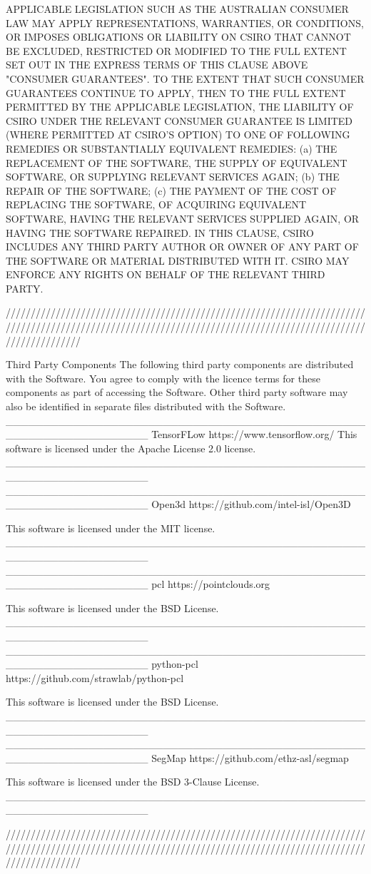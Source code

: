 APPLICABLE LEGISLATION SUCH AS THE AUSTRALIAN CONSUMER LAW MAY APPLY REPRESENTATIONS, WARRANTIES, OR CONDITIONS, OR IMPOSES OBLIGATIONS OR LIABILITY ON CSIRO THAT CANNOT BE EXCLUDED, RESTRICTED OR MODIFIED TO THE FULL EXTENT SET OUT IN THE EXPRESS TERMS OF THIS CLAUSE ABOVE "CONSUMER GUARANTEES".  TO THE EXTENT THAT SUCH CONSUMER GUARANTEES CONTINUE TO APPLY, THEN TO THE FULL EXTENT PERMITTED BY THE APPLICABLE LEGISLATION, THE LIABILITY OF CSIRO UNDER THE RELEVANT CONSUMER GUARANTEE IS LIMITED (WHERE PERMITTED AT CSIRO’S OPTION) TO ONE OF FOLLOWING REMEDIES OR SUBSTANTIALLY EQUIVALENT REMEDIES:
(a)               THE REPLACEMENT OF THE SOFTWARE, THE SUPPLY OF EQUIVALENT SOFTWARE, OR SUPPLYING RELEVANT SERVICES AGAIN;
(b)               THE REPAIR OF THE SOFTWARE;
(c)               THE PAYMENT OF THE COST OF REPLACING THE SOFTWARE, OF ACQUIRING EQUIVALENT SOFTWARE, HAVING THE RELEVANT SERVICES SUPPLIED AGAIN, OR HAVING THE SOFTWARE REPAIRED.
IN THIS CLAUSE, CSIRO INCLUDES ANY THIRD PARTY AUTHOR OR OWNER OF ANY PART OF THE SOFTWARE OR MATERIAL DISTRIBUTED WITH IT.  CSIRO MAY ENFORCE ANY RIGHTS ON BEHALF OF THE RELEVANT THIRD PARTY.

///////////////////////////////////////////////////////////////////////////////////////////////////////////////////////////////////////////////////////////////

Third Party Components
The following third party components are distributed with the Software.  You agree to comply with the licence terms for these components as part of accessing the Software.  Other third party software may also be identified in separate files distributed with the Software.
___________________________________________________________________
TensorFLow  https://www.tensorflow.org/
This software is licensed under the Apache License 2.0 license.
___________________________________________________________________
___________________________________________________________________
Open3d https://github.com/intel-isl/Open3D

This software is licensed under the MIT license.
___________________________________________________________________
___________________________________________________________________
pcl https://pointclouds.org

This software is licensed under the BSD License.
___________________________________________________________________
___________________________________________________________________
python-pcl https://github.com/strawlab/python-pcl

This software is licensed under the BSD License.
___________________________________________________________________
___________________________________________________________________
SegMap https://github.com/ethz-asl/segmap

This software is licensed under the BSD 3-Clause License.
___________________________________________________________________

///////////////////////////////////////////////////////////////////////////////////////////////////////////////////////////////////////////////////////////////



